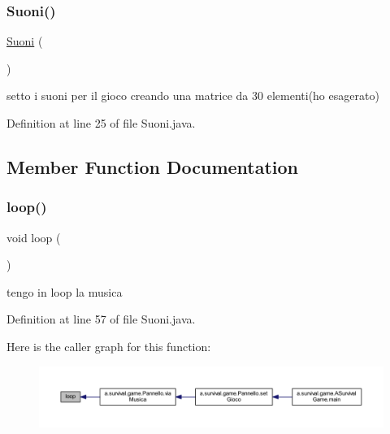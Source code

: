 \subsubsection{\texorpdfstring{Suoni()}{Suoni()}}
{\footnotesize\ttfamily \hyperlink{classa_1_1survival_1_1game_1_1_suoni}{Suoni} (\begin{DoxyParamCaption}{ }\end{DoxyParamCaption})}



setto i suoni per il gioco creando una matrice da 30 elementi(ho esagerato) 



Definition at line 25 of file Suoni.\+java.



\subsection{Member Function Documentation}
\mbox{\label{classa_1_1survival_1_1game_1_1_suoni_afe461d27b9c48d5921c00d521181f12f}} 
\subsubsection{\texorpdfstring{loop()}{loop()}}
{\footnotesize\ttfamily void loop (\begin{DoxyParamCaption}{ }\end{DoxyParamCaption})}



tengo in loop la musica 



Definition at line 57 of file Suoni.\+java.

Here is the caller graph for this function\+:
\nopagebreak
\begin{figure}[H]
\begin{center}
\leavevmode
\includegraphics[width=350pt]{classa_1_1survival_1_1game_1_1_suoni_afe461d27b9c48d5921c00d521181f12f_icgraph}
\end{center}
\end{figure}
\mbox{\label{classa_1_1survival_1_1game_1_1_suoni_ae823b8f4c288feca83157a7622d42652}} 
